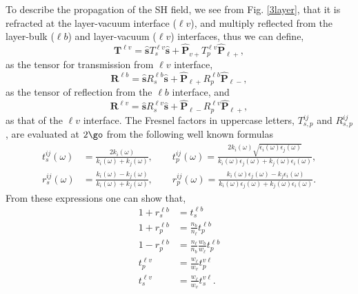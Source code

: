 To describe the propagation of the SH field, we  see from
Fig. \ref{3layer}, that it is refracted at the 
layer-vacuum interface ($\ell v$), and multiply reflected from the
layer-bulk ($\ell b$)
and layer-vacuum ($\ell v$)
interfaces, thus we can define,
\begin{equation}\label{r5}
\mathbf{T}^{\ell v}
= \hat{\mathbf{s}}T_s^{\ell v}\hat{\mathbf{s}} 
+ \hat{\mathbf{P}}_{v+}T_{p}^{\ell v} \hat{\mathbf{P}}_{\ell +},
\end{equation}
as the tensor for transmission from $\ell v$ interface,
\begin{equation}\label{r6}
\mathbf{R}^{\ell b}
= \hat{\mathbf{s}}R_s^{\ell b}\hat{\mathbf{s}}
+ \hat{\mathbf{P}}_{\ell +}R_{p}^{\ell b} \hat{\mathbf{P}}_{\ell -},
\end{equation} 
as the tensor of reflection from the $\ell b$ interface, 
and
\begin{equation}\label{r6b}
\mathbf{R}^{\ell v}
= \hat{\mathbf{s}}R_s^{\ell v}\hat{\mathbf{s}}
+ \hat{\mathbf{P}}_{\ell -}R_{p}^{\ell v} \hat{\mathbf{P}}_{\ell +},
\end{equation} 
as that of the $\ell v$ interface. 
The Fresnel factors in uppercase letters, $T^{ij}_{s,p}$ and $R^{ij}_{s,p}$,
are evaluated at $2\go$  from the following well known formulas 
\begin{equation}\label{e.f1}
\begin{split}
t_s^{ij}(\omega) &=
\frac{2k_{i}(\omega)}{k_{i}(\omega)+k_{j}(\omega)},
\quad\quad  
t_{p}^{ij}(\omega) =
\frac{2k_{i}(\omega)\sqrt{\epsilon_{i}(\omega)\epsilon_j(\omega)}}
     {k_{i}(\omega)\epsilon_{j}(\omega)+k_{j}(\omega)\epsilon_{i}(\omega)},\\
r_s^{ij}(\omega) &=
\frac{k_{i}(\omega) - k_{j}(\omega)}
     {k_{i}(\omega) + k_{j}(\omega)},
\quad\quad 
r_{p}^{ij}(\omega) =
\frac{k_{i}(\omega)\epsilon_{j}(\omega) - k_{j}\epsilon_{i}(\omega)}
     {k_{i}(\omega)\epsilon_{j}(\omega) + k_{j}(\omega)\epsilon_{i}(\omega)}. 
\end{split}
\end{equation}
From these expressions one can show that,
\begin{align}\label{mf}
1 + r^{\ell b}_{s} &= t^{\ell b}_{s}\nonumber\\
1 + r^{\ell b}_{p}
&= \frac{n_b}{n_\ell}
t^{\ell b}_{p} 
\nonumber\\
1 - r^{\ell b}_{p}
&= \frac{n_\ell}{n_b}
   \frac{w_{b}}{w_{\ell}}t^{\ell b}_{p}\\
t^{\ell v}_{p} &= \frac{w_{\ell}}{w_{v}}t^{v\ell}_{p}\nonumber\\
t^{\ell v}_{s} &= \frac{w_{\ell}}{w_{v}}t^{v\ell}_{s}\nonumber 
.
\end{align}


